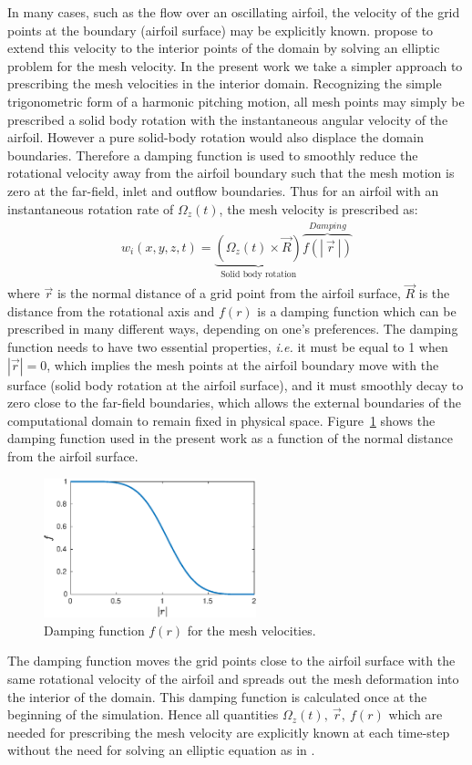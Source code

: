 In many cases, such as the flow over an oscillating airfoil, the velocity of the grid points at the boundary (airfoil surface) may be explicitly known. \cite{ho90,ho91} propose to extend this velocity to the interior points of the domain by solving an elliptic problem for the mesh velocity. In the present work we take a simpler approach to prescribing the mesh velocities in the interior domain. Recognizing the simple trigonometric form of a harmonic pitching motion, all mesh points may simply be prescribed a solid body rotation with the instantaneous angular velocity of the airfoil. However a pure solid-body rotation would also displace the domain boundaries. Therefore a damping function is used to smoothly reduce the rotational velocity away from the airfoil boundary such that the mesh motion is zero at the far-field, inlet and outflow boundaries. Thus for an airfoil with an instantaneous rotation rate of $\Omega_{z}(t)$, the mesh velocity is prescribed as:
\begin{align}
	w_{i}(x,y,z,t) = \underbrace{(\Omega_{z}(t) \times \vec{R})}_{\text{Solid body rotation}} \overbrace{f(|\ \vec{r}\ |)}^{Damping}
	\label{eqn:mesh_velocity}
\end{align}
where $\vec{r}$ is the normal distance of a grid point from the airfoil surface, $\vec{R}$ is the distance from the rotational axis and $f(r)$ is a damping function which can be prescribed in many different ways, depending on one's preferences. The damping function needs to have two essential properties, \textit{i.e.} it must be equal to 1 when $|\vec{r}|=0$, which implies the mesh points at the airfoil boundary move with the surface (solid body rotation at the airfoil surface), and it must smoothly decay to zero close to the far-field boundaries, which allows the external boundaries of the computational domain to remain fixed in physical space. Figure~\ref{fig:mesh_rotation_damping} shows the damping function used in the present work as a function of the normal distance from the airfoil surface.
\begin{figure}[h]
	\centering
	\includegraphics[width=0.55\textwidth]{damping_func}
	\vspace{5pt}
	\caption{Damping function $f(r)$ for the mesh velocities.}
	\label{fig:mesh_rotation_damping}
\end{figure}
The damping function moves the grid points close to the airfoil surface with the same rotational velocity of the airfoil and spreads out the mesh deformation into the interior of the domain. This damping function is calculated once at the beginning of the simulation. Hence all quantities $\Omega_{z}(t),\ \vec{r},\ f(r)$ which are needed for prescribing the mesh velocity are explicitly known at each time-step without the need for solving an elliptic equation as in \cite{ho90,ho91}. 

